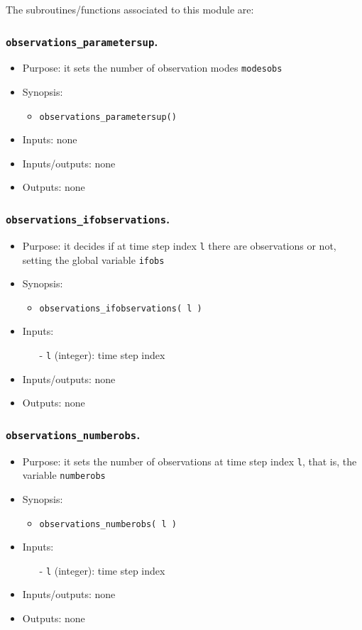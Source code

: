 \documentclass[12pt]{article}
\begin{document}
The subroutines/functions associated to this module are:

\subsubsection{{\tt observations\_parametersup}.}
\begin{itemize}
\item Purpose: it sets the number of observation modes {\tt modesobs}
\item Synopsis: 
\begin{itemize}
\item {\tt observations\_parametersup()}
\end{itemize}
\item Inputs: none
\item Inputs/outputs: none
\item Outputs: none
\end{itemize} 

\subsubsection{{\tt observations\_ifobservations}.}
\begin{itemize}
\item Purpose: it decides if at time step index {\tt l} there are observations or not, setting the global variable {\tt ifobs}
\item Synopsis: 
\begin{itemize}
\item {\tt observations\_ifobservations( l )}
\end{itemize}
\item Inputs: 
\begin{itemize}
\item[-] {\tt l} (integer): time step index
\end{itemize}
\item Inputs/outputs: none
\item Outputs: none
\end{itemize} 

\subsubsection{{\tt observations\_numberobs}.} 
\begin{itemize}
\item Purpose: it sets the number of observations at time step index {\tt l}, that is, the variable {\tt numberobs}
\item Synopsis: 
\begin{itemize}
\item {\tt observations\_numberobs( l )}
\end{itemize}
\item Inputs: 
\begin{itemize}
\item[-] {\tt l} (integer): time step index
\end{itemize}
\item Inputs/outputs: none
\item Outputs: none
\end{itemize} 
\end{document}
